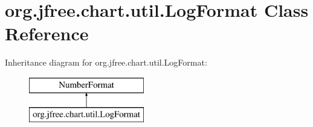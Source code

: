 \hypertarget{classorg_1_1jfree_1_1chart_1_1util_1_1_log_format}{}\section{org.\+jfree.\+chart.\+util.\+Log\+Format Class Reference}
\label{classorg_1_1jfree_1_1chart_1_1util_1_1_log_format}
Inheritance diagram for org.\+jfree.\+chart.\+util.\+Log\+Format\+:\begin{figure}[H]
\begin{center}
\leavevmode
\includegraphics[height=2.000000cm]{classorg_1_1jfree_1_1chart_1_1util_1_1_log_format}
\end{center}
\end{figure}
